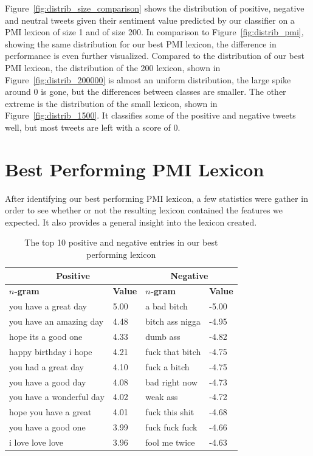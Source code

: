 Figure~\ref{fig:distrib_size_comparison} shows the distribution of positive, negative and neutral tweets given their sentiment value predicted by our classifier on a PMI lexicon of size 1 and of size 200. In comparison to Figure~\ref{fig:distrib_pmi}, showing the same distribution for our best PMI lexicon, the difference in performance is even further visualized. Compared to the distribution of our best PMI lexicon, the distribution of the 200 lexicon, shown in Figure~\ref{fig:distrib_200000} is almost an uniform distribution, the large spike around 0 is gone, but the differences between classes are smaller. The other extreme is the distribution of the small lexicon, shown in Figure~\ref{fig:distrib_1500}. It classifies some of the positive and negative tweets well, but most tweets are left with a score of 0.

\section{Best Performing PMI Lexicon}
After identifying our best performing PMI lexicon, a few statistics were gather in order to see whether or not the resulting lexicon contained the features we expected. It also provides a general insight into the lexicon created. \\

\begin{table}[t]
    \begin{tabular}{| l | l || l | l |}
        \hline
        \multicolumn{2}{|c||}{\textbf{Positive}} & \multicolumn{2}{c|}{\textbf{Negative}} \\ \hline
        \textbf{$n$-gram} & \textbf{Value} & \textbf{$n$-gram} & \textbf{Value} \\ \hline
        you have a great day        & 5.00 & a bad bitch        & -5.00 \\ \hline
        you have an amazing day     & 4.48 & bitch ass nigga    & -4.95 \\ \hline
        hope its a good one         & 4.33 & dumb ass           & -4.82 \\ \hline
        happy birthday i hope       & 4.21 & fuck that bitch    & -4.75 \\ \hline
        you had a great day         & 4.10 & fuck a bitch       & -4.75 \\ \hline
        you have a good day         & 4.08 & bad right now      & -4.73 \\ \hline
        you have a wonderful day    & 4.02 & weak ass           & -4.72 \\ \hline
        hope you have a great       & 4.01 & fuck this shit     & -4.68 \\ \hline
        you have a good one         & 3.99 & fuck fuck fuck     & -4.66 \\ \hline
        i love love love            & 3.96 & fool me twice      & -4.63 \\ \hline
    \end{tabular}
    \caption[Top 10 positive and negative entries in our lexicon]{The top 10 positive and negative entries in our best performing lexicon}
    \label{tab:lexicon_ngram_entries}
\end{table}

